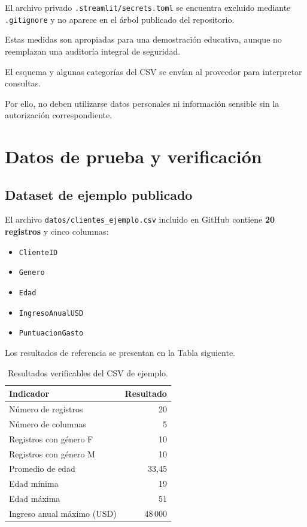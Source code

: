 \documentclass[11pt,a4paper]{article}
\begin{document}
El archivo privado \texttt{.streamlit/secrets.toml}
se encuentra excluido mediante \texttt{.gitignore}
y no aparece en el árbol publicado del repositorio.

Estas medidas son apropiadas para una demostración
educativa, aunque no reemplazan una auditoría
integral de seguridad.

El esquema y algunas categorías del CSV se envían
al proveedor para interpretar consultas.

Por ello, no deben utilizarse datos personales
ni información sensible sin la autorización
correspondiente.

\section{Datos de prueba y verificación}

\subsection{Dataset de ejemplo publicado}

El archivo \texttt{datos/clientes\_ejemplo.csv}
incluido en GitHub contiene \textbf{20 registros}
y cinco columnas:

\begin{itemize}
\item \texttt{ClienteID}
\item \texttt{Genero}
\item \texttt{Edad}
\item \texttt{IngresoAnualUSD}
\item \texttt{PuntuacionGasto}
\end{itemize}

Los resultados de referencia se presentan
en la Tabla siguiente.

\begin{table}[H]
\centering
\small
\caption{Resultados verificables del CSV de ejemplo.}

\begin{tabularx}{\textwidth}{@{}Xr@{}}
\toprule
\textbf{Indicador} & \textbf{Resultado}\\
\midrule
Número de registros & 20\\
Número de columnas & 5\\
Registros con género F & 10\\
Registros con género M & 10\\
Promedio de edad & 33,45\\
Edad mínima & 19\\
Edad máxima & 51\\
Ingreso anual máximo (USD) & 48\,000\\
\bottomrule
\end{tabularx}
\end{table}
\end{document}
